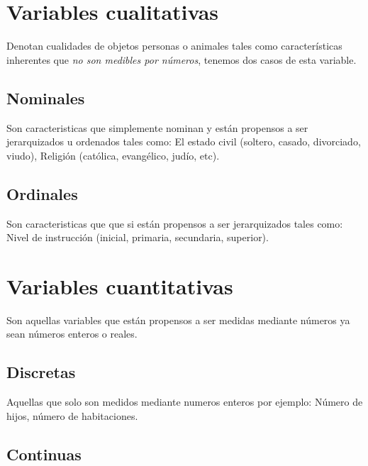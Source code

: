 \documentclass[10pt,]{krantz}
\theoremstyle{definition}
\theoremstyle{definition}
\theoremstyle{definition}
\theoremstyle{definition}
\theoremstyle{remark}
\begin{document}
\hypertarget{variables-cualitativas}{%
\section{Variables cualitativas}\label{variables-cualitativas}}

Denotan cualidades de objetos personas o animales tales como características inherentes que \emph{no son medibles por números}, tenemos dos casos de esta variable.

\hypertarget{nominales}{%
\subsection{Nominales}\label{nominales}}

Son caracteristicas que simplemente nominan y están propensos a ser jerarquizados u ordenados tales como: El estado civil (soltero, casado, divorciado, viudo), Religión (católica, evangélico, judío, etc).

\hypertarget{ordinales}{%
\subsection{Ordinales}\label{ordinales}}

Son caracteristicas que que si están propensos a ser jerarquizados tales como: Nivel de instrucción (inicial, primaria, secundaria, superior).

\hypertarget{variables-cuantitativas}{%
\section{Variables cuantitativas}\label{variables-cuantitativas}}

Son aquellas variables que están propensos a ser medidas mediante números ya sean números enteros o reales.

\hypertarget{discretas}{%
\subsection{Discretas}\label{discretas}}

Aquellas que solo son medidos mediante numeros enteros por ejemplo: Número de hijos, número de habitaciones.

\hypertarget{continuas}{%
\subsection{Continuas}\label{continuas}}
\end{document}
